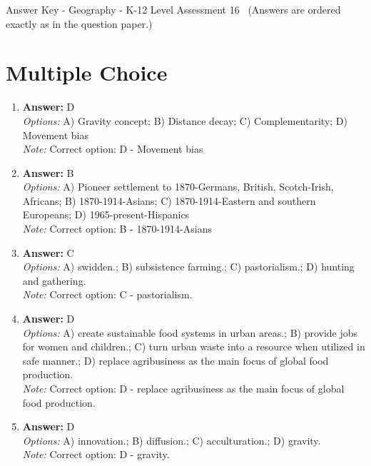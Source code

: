 \documentclass[12pt]{article}
\begin{document}
\begin{center}
Answer Key - Geography - K-12 Level Assessment 16 \
\small (Answers are ordered exactly as in the question paper.)
\end{center}

\section*{Multiple Choice}
\begin{enumerate}[label=\arabic*.]
\item \textbf{Answer:} D
\\ \textit{Options:} A) Gravity concept; B) Distance decay; C) Complementarity; D) Movement bias
\\ \textit{Note:} Correct option: D - Movement bias
\item \textbf{Answer:} B
\\ \textit{Options:} A) Pioneer settlement to 1870-Germans, British, Scotch-Irish, Africans; B) 1870-1914-Asians; C) 1870-1914-Eastern and southern Europeans; D) 1965-present-Hispanics
\\ \textit{Note:} Correct option: B - 1870-1914-Asians
\item \textbf{Answer:} C
\\ \textit{Options:} A) swidden.; B) subsistence farming.; C) pastorialism.; D) hunting and gathering.
\\ \textit{Note:} Correct option: C - pastorialism.
\item \textbf{Answer:} D
\\ \textit{Options:} A) create sustainable food systems in urban areas.; B) provide jobs for women and children.; C) turn urban waste into a resource when utilized in safe manner.; D) replace agribusiness as the main focus of global food production.
\\ \textit{Note:} Correct option: D - replace agribusiness as the main focus of global food production.
\item \textbf{Answer:} D
\\ \textit{Options:} A) innovation.; B) diffusion.; C) acculturation.; D) gravity.
\\ \textit{Note:} Correct option: D - gravity.
\end{enumerate}
\end{document}
